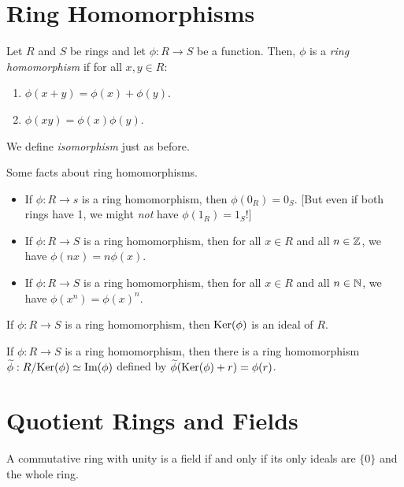 \section*{Ring Homomorphisms}

\begin{definition}
	Let $R$ and $S$ be rings and let $\phi : R \rightarrow S$ be a function. Then,
	$\phi$ is a \emph{ring homomorphism} if for all $x, y \in R$:
	\begin{enumerate}
		\item $\phi(x + y) = \phi(x) + \phi(y)$.
		\item $\phi(xy) = \phi(x) \phi(y)$.
	\end{enumerate}
	We define \emph{isomorphism} just as before.
\end{definition}

\begin{facts}
	Some facts about ring homomorphisms.
	\begin{itemize}
		\item If $\phi : R \rightarrow s$ is a ring homomorphism, then $\phi(0_R) =
			0_S$. [But even if both rings have 1, we might \emph{not} have $\phi(1_R)
			= 1_S$!]
		\item If $\phi : R \rightarrow S$ is a ring homomorphism, then for all $x
			\in R$ and all $n \in {\mathbb{Z}}$, we have $\phi(nx) = n \phi(x)$.
		\item If $\phi : R \rightarrow S$ is a ring homomorphism, then for all $x
			\in R$ and all $n \in {\mathbb{N}}$, we have $\phi(x^n) = {\phi(x)}^n$.
	\end{itemize}
\end{facts}

\begin{theorem}
	If $\phi : R \rightarrow S$ is a ring homomorphism, then $\text{Ker}(\phi)$ is an
	ideal of $R$.
\end{theorem}

\begin{theorem}
	If $\phi : R \rightarrow S$ is a ring homomorphism, then there is a ring
	homomorphism $\widetilde{\phi} : R/\text{Ker}(\phi) \simeq \text{Im}(\phi)$ defined by
	$\widetilde{\phi}(\text{Ker}(\phi) + r) = \phi(r)$.
\end{theorem}

\section*{Quotient Rings and Fields}

\begin{theorem}
	A commutative ring with unity is a field if and only if its only ideals are
	$\{0\}$ and the whole ring.
\end{theorem}

